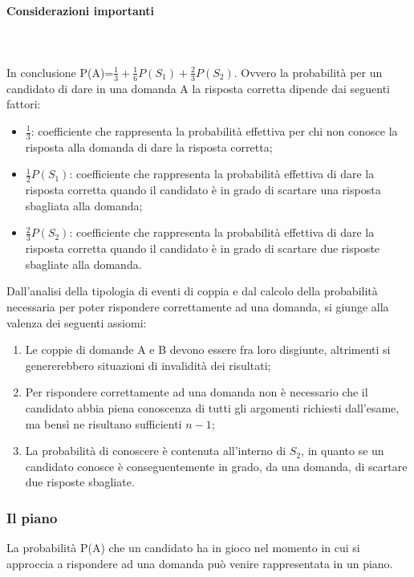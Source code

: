  \paragraph{Considerazioni importanti} \mbox{}\\\\
 \label{Considerazioni importanti}
 \noindent
In conclusione P(A)=$\frac{1}{3}+\frac{1}{6}P(S_1)+\frac{2}{3}P(S_2)$.
Ovvero la probabilit\`a  per un candidato di dare in una domanda A la risposta corretta dipende dai seguenti fattori:
  \begin{itemize}
  \item $\frac{1}{3}$: coefficiente che rappresenta la probabilit\`a effettiva per chi non conosce la risposta alla domanda di dare la risposta corretta;
  \item $\frac{1}{2}P(S_1)$: coefficiente che rappresenta la probabilit\`a effettiva di  dare la risposta corretta quando il candidato \`e in grado di scartare una risposta sbagliata alla domanda;
   \item $\frac{2}{3}P(S_2)$: coefficiente che rappresenta la probabilit\`a effettiva di  dare la risposta corretta quando il candidato \`e in grado di scartare due risposte sbagliate alla domanda.
  \end{itemize}
  \noindent
  Dall'analisi della tipologia di eventi di coppia e dal calcolo della probabilit\`a necessaria per poter rispondere correttamente ad una domanda, si giunge alla valenza dei seguenti assiomi:
  \begin{enumerate}
  \item Le coppie di domande A e B devono essere fra loro disgiunte, altrimenti si genererebbero situazioni di invalidit\`a dei risultati;
  \item Per rispondere correttamente ad una domanda non \`e necessario che il candidato abbia piena conoscenza di tutti gli argomenti richiesti dall'esame, ma bens\`i ne risultano sufficienti $n-1$;
  \item La probabilit\`a di conoscere \`e contenuta all'interno di $S_{2}$, in quanto se un candidato conosce \`e conseguentemente in grado, da una domanda, di scartare due risposte sbagliate.
  \end{enumerate}
  
\subsubsection{Il piano}
\label{Il piano}
\noindent
La probabilit\`a P(A) che un candidato ha in gioco nel momento in cui si approccia a rispondere ad una domanda pu\`o venire rappresentata in un piano.\\\\

